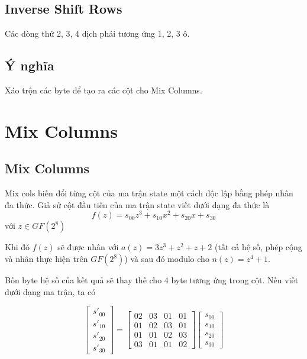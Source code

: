 \documentclass[a5paper]{article}
\begin{document}
    \subsection{Inverse Shift Rows}
    
    Các dòng thứ 2, 3, 4 dịch phải tương ứng 1, 2, 3 ô.

    \subsection{Ý nghĩa}

    Xáo trộn các byte để tạo ra các cột cho Mix Columns.

    \section{Mix Columns}

    \subsection{Mix Columns}

    Mix cols biến đổi từng cột của ma trận state một cách độc lập bằng phép nhân đa thức. Giả sử cột đầu tiên của ma trận state viết dưới dạng đa thức là
    \[f(z) = s_{00} z^3 + s_{10} x^2 + s_{20} x + s_{30} \] với $z \in GF(2^8)$

    Khi đó $f(z)$ sẽ được nhân với $a(z) = 3z^3 + z^2 + z + 2$ (tất cả hệ số, phép cộng và nhân thực hiện trên $GF(2^8)$) và sau đó modulo cho $n(z) = z^4 + 1$.

    Bốn byte hệ số của kết quả sẽ thay thế cho 4 byte tương ứng trong cột. Nếu viết dưới dạng ma trận, ta có

    \[ \begin{bmatrix}
        s'_{00} \\ s'_{10} \\ s'_{20} \\ s'_{30}
    \end{bmatrix} = \begin{bmatrix}
        02 & 03 & 01 & 01 \\
        01 & 02 & 03 & 01 \\
        01 & 01 & 02 & 03 \\
        03 & 01 & 01 & 02
    \end{bmatrix} 
    \begin{bmatrix}
        s_{00} \\ s_{10} \\ s_{20} \\ s_{30}
    \end{bmatrix}\]
\end{document}
